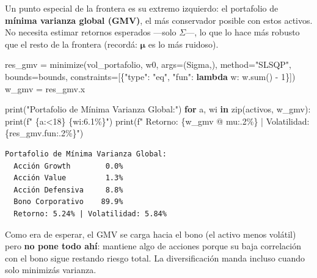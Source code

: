 \documentclass[
  spanish,
  letterpaper,
  DIV=11,
  numbers=noendperiod]{scrreprt}
\newenvironment{Shaded}{\begin{snugshade}}{\end{snugshade}}
\newcommand{\BuiltInTok}[1]{\textcolor[rgb]{0.00,0.23,0.31}{#1}}
\newcommand{\ControlFlowTok}[1]{\textcolor[rgb]{0.00,0.23,0.31}{\textbf{#1}}}
\newcommand{\DecValTok}[1]{\textcolor[rgb]{0.68,0.00,0.00}{#1}}
\newcommand{\KeywordTok}[1]{\textcolor[rgb]{0.00,0.23,0.31}{\textbf{#1}}}
\newcommand{\NormalTok}[1]{\textcolor[rgb]{0.00,0.23,0.31}{#1}}
\newcommand{\OperatorTok}[1]{\textcolor[rgb]{0.37,0.37,0.37}{#1}}
\newcommand{\SpecialCharTok}[1]{\textcolor[rgb]{0.37,0.37,0.37}{#1}}
\newcommand{\SpecialStringTok}[1]{\textcolor[rgb]{0.13,0.47,0.30}{#1}}
\newcommand{\StringTok}[1]{\textcolor[rgb]{0.13,0.47,0.30}{#1}}
\begin{document}
Un punto especial de la frontera es su extremo izquierdo: el portafolio
de \textbf{mínima varianza global (GMV)}, el más conservador posible con
estos activos. No necesita estimar retornos esperados ---solo
\(\Sigma\)---, lo que lo hace más robusto que el resto de la frontera
(recordá: \(\boldsymbol{\mu}\) es lo más ruidoso).

\label{gmv}
\begin{Shaded}
\begin{Highlighting}[]
\NormalTok{res\_gmv }\OperatorTok{=}\NormalTok{ minimize(vol\_portafolio, w0, args}\OperatorTok{=}\NormalTok{(Sigma,),}
\NormalTok{                   method}\OperatorTok{=}\StringTok{"SLSQP"}\NormalTok{, bounds}\OperatorTok{=}\NormalTok{bounds,}
\NormalTok{                   constraints}\OperatorTok{=}\NormalTok{[\{}\StringTok{"type"}\NormalTok{: }\StringTok{"eq"}\NormalTok{, }\StringTok{"fun"}\NormalTok{: }\KeywordTok{lambda}\NormalTok{ w: w.}\BuiltInTok{sum}\NormalTok{() }\OperatorTok{{-}} \DecValTok{1}\NormalTok{\}])}
\NormalTok{w\_gmv }\OperatorTok{=}\NormalTok{ res\_gmv.x}

\BuiltInTok{print}\NormalTok{(}\StringTok{"Portafolio de Mínima Varianza Global:"}\NormalTok{)}
\ControlFlowTok{for}\NormalTok{ a, wi }\KeywordTok{in} \BuiltInTok{zip}\NormalTok{(activos, w\_gmv):}
    \BuiltInTok{print}\NormalTok{(}\SpecialStringTok{f"  }\SpecialCharTok{\{}\NormalTok{a}\SpecialCharTok{:\textless{}18\}}\SpecialStringTok{ }\SpecialCharTok{\{}\NormalTok{wi}\SpecialCharTok{:6.1\%\}}\SpecialStringTok{"}\NormalTok{)}
\BuiltInTok{print}\NormalTok{(}\SpecialStringTok{f"  Retorno: }\SpecialCharTok{\{}\NormalTok{w\_gmv }\OperatorTok{@}\NormalTok{ mu}\SpecialCharTok{:.2\%\}}\SpecialStringTok{ | Volatilidad: }\SpecialCharTok{\{}\NormalTok{res\_gmv}\SpecialCharTok{.}\NormalTok{fun}\SpecialCharTok{:.2\%\}}\SpecialStringTok{"}\NormalTok{)}
\end{Highlighting}
\end{Shaded}

\begin{verbatim}
Portafolio de Mínima Varianza Global:
  Acción Growth        0.0%
  Acción Value         1.3%
  Acción Defensiva     8.8%
  Bono Corporativo    89.9%
  Retorno: 5.24% | Volatilidad: 5.84%
\end{verbatim}

Como era de esperar, el GMV se carga hacia el bono (el activo menos
volátil) pero \textbf{no pone todo ahí}: mantiene algo de acciones
porque su baja correlación con el bono sigue restando riesgo total. La
diversificación manda incluso cuando solo minimizás varianza.
\end{document}
